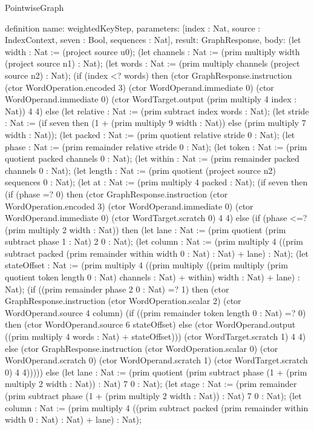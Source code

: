 \begin{lexlean}{PointwiseGraph}
\begin{semanticmodule}
definition{
  name: weightedKeyStep,
  parameters: [index : Nat, source : IndexContext, seven : Bool, sequences : Nat],
  result: GraphResponse,
  body: (let width : Nat := (project source u0);
      (let channels : Nat := (prim multiply width (project source n1) : Nat);
      (let words : Nat := (prim multiply channels (project source n2) : Nat);
      (if (index <? words) then (ctor GraphResponse.instruction (ctor WordOperation.encoded 3) (ctor WordOperand.immediate 0) (ctor WordOperand.immediate 0) (ctor WordTarget.output (prim multiply 4 index : Nat)) 4 4) else (let relative : Nat := (prim subtract index words : Nat);
      (let stride : Nat := (if seven then (1 + (prim multiply 9 width : Nat)) else (prim multiply 7 width : Nat));
      (let packed : Nat := (prim quotient relative stride 0 : Nat);
      (let phase : Nat := (prim remainder relative stride 0 : Nat);
      (let token : Nat := (prim quotient packed channels 0 : Nat);
      (let within : Nat := (prim remainder packed channels 0 : Nat);
      (let length : Nat := (prim quotient (project source n2) sequences 0 : Nat);
      (let at : Nat := (prim multiply 4 packed : Nat);
      (if seven then (if (phase =? 0) then (ctor GraphResponse.instruction (ctor WordOperation.encoded 3) (ctor WordOperand.immediate 0) (ctor WordOperand.immediate 0) (ctor WordTarget.scratch 0) 4 4) else (if (phase <=? (prim multiply 2 width : Nat)) then (let lane : Nat := (prim quotient (prim subtract phase 1 : Nat) 2 0 : Nat);
      (let column : Nat := (prim multiply 4 ((prim subtract packed (prim remainder within width 0 : Nat) : Nat) + lane) : Nat);
      (let stateOffset : Nat := (prim multiply 4 ((prim multiply ((prim multiply (prim quotient token length 0 : Nat) channels : Nat) + within) width : Nat) + lane) : Nat);
      (if ((prim remainder phase 2 0 : Nat) =? 1) then (ctor GraphResponse.instruction (ctor WordOperation.scalar 2) (ctor WordOperand.source 4 column) (if ((prim remainder token length 0 : Nat) =? 0) then (ctor WordOperand.source 6 stateOffset) else (ctor WordOperand.output ((prim multiply 4 words : Nat) + stateOffset))) (ctor WordTarget.scratch 1) 4 4) else (ctor GraphResponse.instruction (ctor WordOperation.scalar 0) (ctor WordOperand.scratch 0) (ctor WordOperand.scratch 1) (ctor WordTarget.scratch 0) 4 4))))) else (let lane : Nat := (prim quotient (prim subtract phase (1 + (prim multiply 2 width : Nat)) : Nat) 7 0 : Nat);
      (let stage : Nat := (prim remainder (prim subtract phase (1 + (prim multiply 2 width : Nat)) : Nat) 7 0 : Nat);
      (let column : Nat := (prim multiply 4 ((prim subtract packed (prim remainder within width 0 : Nat) : Nat) + lane) : Nat);
}
\end{semanticmodule}
\end{lexlean}

